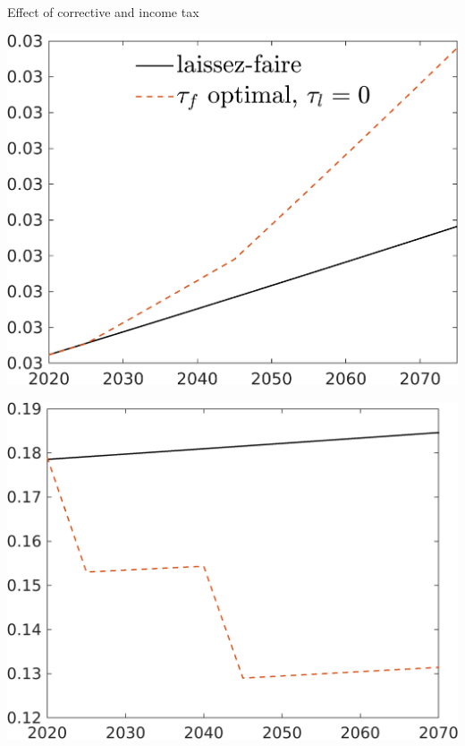 \documentclass[11pt,aspectratio=169]{beamer}
\begin{document}
\begin{frame}{Effect of corrective and income tax}
	\centering
	\begin{minipage}[]{0.3\textwidth}
		\includegraphics[width=1\textwidth]{../codding_model/own_basedOnFried/optimalPol_elastS_DisuSci/figures/all_1705/CompCounterFac_withLF_noopt_taufopt1_taulopt0_AgAf_spillover0_noskill0_sep1_BN0_ineq0_red0_xgrowth0_etaa0.79_lgd1.png}
	\end{minipage}
	\begin{minipage}[]{0.3\textwidth}
		\includegraphics[width=1\textwidth]{../codding_model/own_basedOnFried/optimalPol_elastS_DisuSci/figures/all_1705/CompCounterFac_withLF_noopt_taufopt1_taulopt0_gAagg_spillover0_noskill0_sep1_BN0_ineq0_red0_xgrowth0_etaa0.79_lgd0.png}

\end{minipage}
\end{frame}
\end{document}
